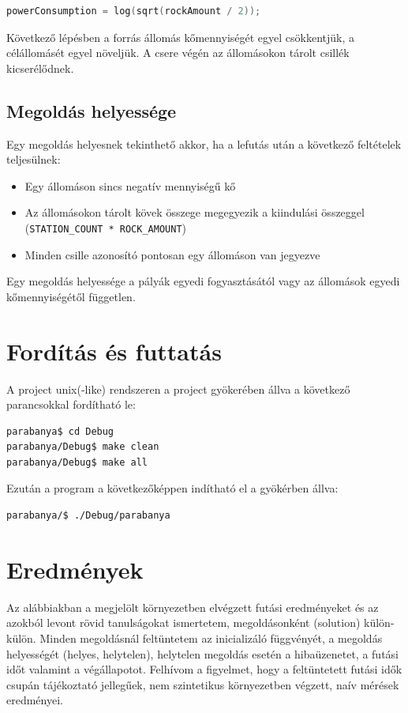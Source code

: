 \documentclass[a4paper,10pt]{article}
\begin{document}
\begin{lstlisting}[language=c]
powerConsumption = log(sqrt(rockAmount / 2));
\end{lstlisting}

Következő lépésben a forrás állomás kőmennyiségét egyel csökkentjük, a célállomásét egyel növeljük. A csere végén az állomásokon tárolt csillék kicserélődnek.
    
    \subsection{Megoldás helyessége}
    
Egy megoldás helyesnek tekinthető akkor, ha a lefutás után a következő feltételek teljesülnek:

\begin{itemize}
    \item Egy állomáson sincs negatív mennyiségű kő
    \item Az állomásokon tárolt kövek összege megegyezik a kiindulási összeggel (\texttt{STATION\_COUNT * ROCK\_AMOUNT})
    \item Minden csille azonosító pontosan egy állomáson van jegyezve
\end{itemize}

Egy megoldás helyessége a pályák egyedi fogyasztásától vagy az állomások egyedi kőmennyiségétől független.
    
	\section{Fordítás és futtatás}
	A project unix(-like) rendszeren a project gyökerében állva a következő parancsokkal fordítható le:

\begin{lstlisting}[language=bash]
parabanya$ cd Debug
parabanya/Debug$ make clean
parabanya/Debug$ make all
\end{lstlisting}

    Ezután a program a következőképpen indítható el a gyökérben állva:
    
\begin{lstlisting}[language=bash]
parabanya/$ ./Debug/parabanya
\end{lstlisting}    	
	
	
	\section{Eredmények}
	Az alábbiakban a megjelölt környezetben elvégzett futási eredményeket és az azokból levont rövid tanulságokat ismertetem, megoldásonként (solution) külön-külön. Minden megoldásnál feltüntetem az inicializáló függvényét, a megoldás helyességét (helyes, helytelen), helytelen megoldás esetén a hibaüzenetet, a futási időt valamint a végállapotot. Felhívom a figyelmet, hogy a feltüntetett futási idők csupán tájékoztató jellegűek, nem szintetikus környezetben végzett, naív mérések eredményei.
	
\end{document}
